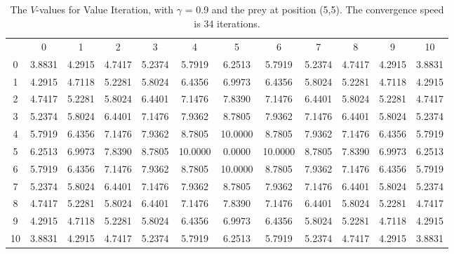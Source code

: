 \documentclass{article}
\begin{document}
\subsection*{}
\begin{table}[tbp]
\centering
\begin{footnotesize}
\begin{tabular} {c c c c c c c c c c c c}
 & 0 & 1 & 2 & 3 & 4 & 5 & 6 & 7 & 8 & 9 & 10 \\
0 &  3.8831 &  4.2915 &  4.7417 &  5.2374 &  5.7919 &  6.2513 &  5.7919 &  5.2374 &  4.7417 &  4.2915 &  3.8831\\
1 &  4.2915 &  4.7118 &  5.2281 &  5.8024 &  6.4356 &  6.9973 &  6.4356 &  5.8024 &  5.2281 &  4.7118 &  4.2915\\
2 &  4.7417 &  5.2281 &  5.8024 &  6.4401 &  7.1476 &  7.8390 &  7.1476 &  6.4401 &  5.8024 &  5.2281 &  4.7417\\
3 &  5.2374 &  5.8024 &  6.4401 &  7.1476 &  7.9362 &  8.7805 &  7.9362 &  7.1476 &  6.4401 &  5.8024 &  5.2374\\
4 &  5.7919 &  6.4356 &  7.1476 &  7.9362 &  8.7805 & 10.0000 &  8.7805 &  7.9362 &  7.1476 &  6.4356 &  5.7919\\
5 &  6.2513 &  6.9973 &  7.8390 &  8.7805 & 10.0000 &  0.0000 & 10.0000 &  8.7805 &  7.8390 &  6.9973 &  6.2513\\
6 &  5.7919 &  6.4356 &  7.1476 &  7.9362 &  8.7805 & 10.0000 &  8.7805 &  7.9362 &  7.1476 &  6.4356 &  5.7919\\
7 &  5.2374 &  5.8024 &  6.4401 &  7.1476 &  7.9362 &  8.7805 &  7.9362 &  7.1476 &  6.4401 &  5.8024 &  5.2374\\
8 &  4.7417 &  5.2281 &  5.8024 &  6.4401 &  7.1476 &  7.8390 &  7.1476 &  6.4401 &  5.8024 &  5.2281 &  4.7417\\
9 &  4.2915 &  4.7118 &  5.2281 &  5.8024 &  6.4356 &  6.9973 &  6.4356 &  5.8024 &  5.2281 &  4.7118 &  4.2915\\
10 &  3.8831 &  4.2915 &  4.7417 &  5.2374 &  5.7919 &  6.2513 &  5.7919 &  5.2374 &  4.7417 &  4.2915 &  3.8831\\\end{tabular}\\
\end{footnotesize}
\caption{The $V$-values for Value Iteration, with $\gamma$ = 0.9 and the prey at position (5,5). The convergence speed is 34 iterations.}
\label{valueiteration4}
\end{table}

\FloatBarrier

\section*{}
\clearpage


\end{document}

